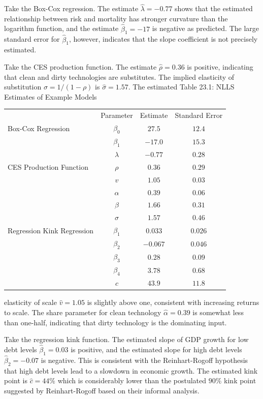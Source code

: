 \documentclass[10pt]{article}
\begin{document}
Take the Box-Cox regression. The estimate $\hat{\lambda}=-0.77$ shows that the estimated relationship between risk and mortality has stronger curvature than the logarithm function, and the estimate $\widehat{\beta}_{1}=-17$ is negative as predicted. The large standard error for $\widehat{\beta}_{1}$, however, indicates that the slope coefficient is not precisely estimated.

Take the CES production function. The estimate $\widehat{\rho}=0.36$ is positive, indicating that clean and dirty technologies are substitutes. The implied elasticity of substitution $\sigma=1 /(1-\rho)$ is $\widehat{\sigma}=1.57$. The estimated Table 23.1: NLLS Estimates of Example Models

\begin{tabular}{lccc}
\hline\hline
\multirow{3}{*}{Box-Cox Regression} & Parameter & Estimate & Standard Error \\
\cline { 2 - 4 }
 & $\beta_{0}$ & $27.5$ & $12.4$ \\
 & $\beta_{1}$ & $-17.0$ & $15.3$ \\
 & $\lambda$ & $-0.77$ & $0.28$ \\
\hline
CES Production Function & $\rho$ & $0.36$ & $0.29$ \\
 & $v$ & $1.05$ & $0.03$ \\
 & $\alpha$ & $0.39$ & $0.06$ \\
 & $\beta$ & $1.66$ & $0.31$ \\
 & $\sigma$ & $1.57$ & $0.46$ \\
\hline
Regression Kink Regression & $\beta_{1}$ & $0.033$ & $0.026$ \\
 & $\beta_{2}$ & $-0.067$ & $0.046$ \\
 & $\beta_{3}$ & $0.28$ & $0.09$ \\
 & $\beta_{4}$ & $3.78$ & $0.68$ \\
 & $c$ & $43.9$ & $11.8$ \\
\hline
\end{tabular}

elasticity of scale $\widehat{v}=1.05$ is slightly above one, consistent with increasing returns to scale. The share parameter for clean technology $\widehat{\alpha}=0.39$ is somewhat less than one-half, indicating that dirty technology is the dominating input.

Take the regression kink function. The estimated slope of GDP growth for low debt levels $\widehat{\beta}_{1}=0.03$ is positive, and the estimated slope for high debt levels $\widehat{\beta}_{2}=-0.07$ is negative. This is consistent with the Reinhart-Rogoff hypothesis that high debt levels lead to a slowdown in economic growth. The estimated kink point is $\widehat{c}=44 \%$ which is considerably lower than the postulated $90 \%$ kink point suggested by Reinhart-Rogoff based on their informal analysis.
\end{document}
